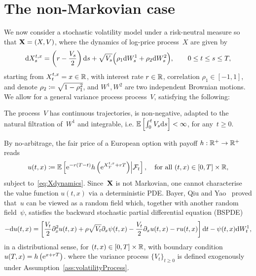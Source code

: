 
\section{The non-Markovian case}\label{sec:non-Markovian_case}

We now consider a stochastic volatility model under a risk-neutral measure so that $\mathbf{X}=\nobreak(X, V)$, where the dynamics of log-price process~$X$ are given by
\begin{equation}\label{eq:Xdynamics}
\mathrm{d} X_{s}^{t, x} = \left(r-\frac{V_{s}}{2}\right)\mathrm{d} s
 + \sqrt{V_{s}}\Big(\rho_1 \mathrm{d} W^1_{s} + \rho_2 \mathrm{d} W^2_{s}\Big), \qquad 0 \leq t \leq s \leq T,
\end{equation}
starting from 
$X_{t}^{t, x} =x\in\mathbb{R}$,
with interest rate $r\in\mathbb{R}$,
correlation $\rho_1 \in [-1,1]$,
and denote $\rho_2\coloneqq \sqrt{1-\rho_1^{2}}$,
and $W^1, W^2$ are two independent Brownian motions.
We allow for a general variance process process~$V$, satisfying the following:
\begin{samepage}
\begin{assumption}\label{ass:volatilityProcess}
The process~$V$ has continuous trajectories, is non-negative, adapted to the natural filtration of~$W^1$ and integrable, i.e.
$\mathbb{E}\left[\int_{0}^{t} V_{s} \mathrm{d} s\right]<\infty$, for any~$t\geq 0$.
\end{assumption}
\end{samepage}
By no-arbitrage, the fair price of a European option with payoff $h:\mathbb{R}^+\rightarrow\mathbb{R}^+$ reads
$$
u(t, x) \coloneqq \mathbb{E}\left[\mathrm{e}^{-r(T-t)} h\left(\mathrm{e}^{X_{T}^{t, x}+r T}\right) \middle\vert \mathcal{F}_{t}\right], 
\quad \text{for all }(t, x) \in[0, T] \times \mathbb{R},
$$
subject to~\eqref{eq:Xdynamics}.
Since~$\mathbf{X}$ is not Markovian, one cannot characterise the value function $u(t, x)$ via a deterministic PDE. 
Bayer, Qiu and Yao~\cite{Bayer2022PricingSPDEs} proved that~$u$ can be viewed as a random field which, together with another random field~$\psi$, satisfies the backward stochastic partial differential equation (BSPDE)
\begin{equation}\label{eq:BSPDEPricing}
-\mathrm{d} u(t,x) = \left[\frac{V_{t}}{2} \partial_x^{2} u(t, x)+\rho \sqrt{V_{t}} \partial_x \psi(t,x)-\frac{V_{t}}{2} \partial_x u(t,x)-r u(t,x)\right] \mathrm{d} t-\psi(t,x) \mathrm{d} W^1_{t},
\end{equation}
in a distributional sense, for $(t, x) \in[0, T] \times \mathbb{R}$, with boundary condition~${u(T, x) = h\left(\mathrm{e}^{x+r T}\right)}$.
where the variance process $\{V_{t}\}_{t \geq 0}$ is defined exogenously under Assumption~\ref{ass:volatilityProcess}. 
